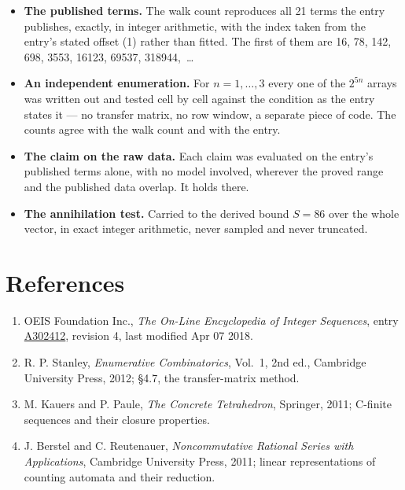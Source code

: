 \documentclass[11pt]{article}
\theoremstyle{definition}
\begin{document}
\begin{itemize}

\item {\bfseries The published terms.} The walk count reproduces all 21 terms the entry publishes, exactly, in integer arithmetic, with the index taken from the entry's stated offset (1) rather than fitted. The first of them are 16, 78, 142, 698, 3553, 16123, 69537, 318944,~\dots

\item {\bfseries An independent enumeration.} For $n = 1,\dots,3$ every one of the $2^{5n}$ arrays was written out and tested cell by cell against the condition as the entry states it --- no transfer matrix, no row window, a separate piece of code. The counts agree with the walk count and with the entry.

\item {\bfseries The claim on the raw data.} Each claim was evaluated on the entry's published terms alone, with no model involved, wherever the proved range and the published data overlap. It holds there.

\item {\bfseries The annihilation test.} Carried to the derived bound $S = 86$ over the whole vector, in exact integer arithmetic, never sampled and never truncated.

\end{itemize}

\section{References}

\begin{enumerate}

\item OEIS Foundation Inc., \emph{The On-Line Encyclopedia of Integer Sequences}, entry \href{https://oeis.org/A302412}{A302412}, revision 4, last modified Apr 07 2018.

\item R. P. Stanley, \emph{Enumerative Combinatorics}, Vol.~1, 2nd ed., Cambridge University Press, 2012; \S4.7, the transfer-matrix method.

\item M. Kauers and P. Paule, \emph{The Concrete Tetrahedron}, Springer, 2011; C-finite sequences and their closure properties.

\item J. Berstel and C. Reutenauer, \emph{Noncommutative Rational Series with Applications}, Cambridge University Press, 2011; linear representations of counting automata and their reduction.

\end{enumerate}
\end{document}
